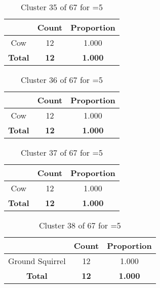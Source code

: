 \begin{table}[ht!]
\centering
\begin{tabular}{|c|c|c|}
\hline
\bf \Spec{} &\bf Count &\bf Proportion\\ \hline \hline
Cow & 12 & 1.000\\ \hline
\hline
\bf Total & \bf 12 & \bf 1.000\\ \hline
\end{tabular}
\label{tab:cluster:35:5}
\caption{Cluster 35 of 67 for \minneigh{}=5}
\end{table}

\begin{table}[ht!]
\centering
\begin{tabular}{|c|c|c|}
\hline
\bf \Spec{} &\bf Count &\bf Proportion\\ \hline \hline
Cow & 12 & 1.000\\ \hline
\hline
\bf Total & \bf 12 & \bf 1.000\\ \hline
\end{tabular}
\label{tab:cluster:36:5}
\caption{Cluster 36 of 67 for \minneigh{}=5}
\end{table}

\begin{table}[ht!]
\centering
\begin{tabular}{|c|c|c|}
\hline
\bf \Spec{} &\bf Count &\bf Proportion\\ \hline \hline
Cow & 12 & 1.000\\ \hline
\hline
\bf Total & \bf 12 & \bf 1.000\\ \hline
\end{tabular}
\label{tab:cluster:37:5}
\caption{Cluster 37 of 67 for \minneigh{}=5}
\end{table}

\begin{table}[ht!]
\centering
\begin{tabular}{|c|c|c|}
\hline
\bf \Spec{} &\bf Count &\bf Proportion\\ \hline \hline
Ground Squirrel & 12 & 1.000\\ \hline
\hline
\bf Total & \bf 12 & \bf 1.000\\ \hline
\end{tabular}
\label{tab:cluster:38:5}
\caption{Cluster 38 of 67 for \minneigh{}=5}
\end{table}

